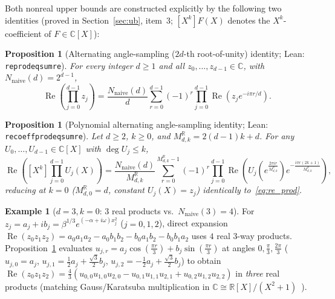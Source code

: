 \documentclass[11pt,a4paper]{article}
\theoremstyle{plain}
\newtheorem{proposition}[theorem]{Proposition}
\theoremstyle{definition}
\newtheorem{example}[theorem]{Example}
\newcommand{\R}{\mathbb{R}}
\newcommand{\C}{\mathbb{C}}
\newcommand{\Nnaive}{N_{\mathrm{naive}}}
\DeclareMathOperator{\RePart}{Re}
\DeclareRobustCommand{\leanid}[1]{{\def\_{\textunderscore\allowbreak}\texttt{#1}}}
\begin{document}
Both nonreal upper bounds are constructed explicitly by the following two identities (proved in Section~\ref{sec:ub}, item~3; $[X^k]F(X)$ denotes the $X^k$-coefficient of $F \in \C[X]$):

\begin{proposition}[Alternating angle-sampling ($2d$-th root-of-unity) identity; Lean: \leanid{re\_prod\_eq\_sum\_re}]\label{prop:roots}
For every integer $d \ge 1$ and all $z_0, \dots, z_{d-1} \in \C$, with $\Nnaive(d) = 2^{d-1}$,
\begin{equation}\label{eq:re_prod}
  \RePart\!\left(\prod_{j=0}^{d-1} z_j\right)
  = \frac{\Nnaive(d)}{d} \sum_{r=0}^{d-1} (-1)^r \prod_{j=0}^{d-1} \RePart\!\left(z_j e^{-i\pi r / d}\right).
\end{equation}
\end{proposition}

\begin{proposition}[Polynomial alternating angle-sampling identity; Lean: \leanid{re\_coeff\_prod\_eq\_sum\_re}]\label{prop:poly_roots}
Let $d \ge 2$, $k \ge 0$, and $M_{d,k}^{\R} = 2(d - 1)k + d$. For any $U_0, \dots, U_{d-1} \in \C[X]$ with $\deg U_j \le k$,
\begin{equation}\label{eq:re_coeff_prod}
  \RePart\!\left([X^k]\prod_{j=0}^{d-1} U_j(X)\right)
  = \frac{\Nnaive(d)}{M_{d,k}^{\R}} \sum_{r=0}^{M_{d,k}^{\R}-1} (-1)^r \prod_{j=0}^{d-1} \RePart\!\left(U_j\!\left(e^{\frac{2\pi i r}{M_{d,k}^{\R}}}\right) e^{-\frac{i\pi r (2k + 1)}{M_{d,k}^{\R}}}\right),
\end{equation}
reducing at $k = 0$ ($M_{d,0}^{\R} = d$, constant $U_j(X) = z_j$) identically to~\eqref{eq:re_prod}.
\end{proposition}

\begin{example}[$d = 3, k = 0$: $3$ real products vs.\ $\Nnaive(3) = 4$]\label{ex:d3_gaussian}
For $z_j = a_j + i b_j = \beta^{1/3}e^{(-\alpha + i\omega)x_j^2}$ ($j = 0, 1, 2$), direct expansion $\RePart(z_0 z_1 z_2) = a_0 a_1 a_2 - a_0 b_1 b_2 - b_0 a_1 b_2 - b_0 b_1 a_2$ uses $4$ real 3-way products. Proposition~\ref{prop:roots} evaluates $u_{j,r} = a_j\cos(\frac{\pi r}{3}) + b_j\sin(\frac{\pi r}{3})$ at angles $0, \frac{\pi}{3}, \frac{2\pi}{3}$ ($u_{j,0} = a_j$, $u_{j,1} = \frac{1}{2}a_j + \frac{\sqrt{3}}{2}b_j$, $u_{j,2} = -\frac{1}{2}a_j + \frac{\sqrt{3}}{2}b_j$) to obtain $\RePart(z_0 z_1 z_2) = \frac{4}{3}(u_{0,0}u_{1,0}u_{2,0} - u_{0,1}u_{1,1}u_{2,1} + u_{0,2}u_{1,2}u_{2,2})$ in \emph{three} real products (matching Gauss/Karatsuba multiplication in $\C \cong \R[X]/(X^2 + 1)$~\cite{winograd1977some}).
\end{example}
\end{document}
